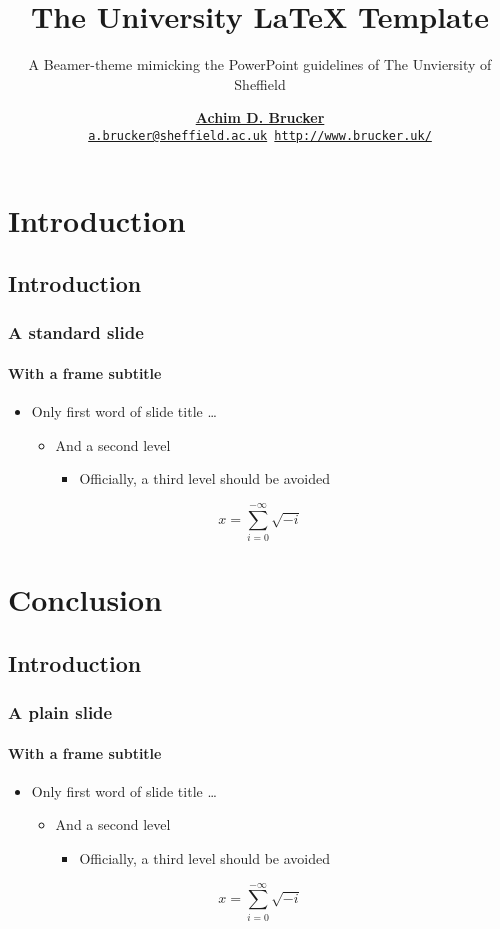 \documentclass[aspectratio=169]{tuos-presentation}
\title{The University \LaTeX{} Template}
\subtitle{A Beamer-theme mimicking the PowerPoint guidelines of The
  Unviersity of Sheffield}
\institute[The University of Sheffield]
{Department of Computer Science, The University of Sheffield, Sheffield, UK}
\author[A.D. Brucker] {%
    \href{http://www.brucker.uk/}{\textbf{Achim D. Brucker}}\\
    \texttt{\footnotesize\href{mailto:"Achim D. Brucker"
        <a.brucker@sheffield.ac.uk>}{a.brucker@sheffield.ac.uk}
      \hspace{.6cm}
      \url{http://www.brucker.uk/}}
    }
\begin{document}
\begin{frame}
  \maketitle
\end{frame}

\AgendaFrame

\section{Introduction}
\subsection{Introduction}
\begin{frame}
  \frametitle{A standard slide}
  \framesubtitle{With a frame subtitle}
  \begin{itemize}
  \item Only first word of slide title \ldots
    \begin{itemize}
    \item  And a second level 
      \begin{itemize}
      \item  Officially, a third level should be avoided
      \end{itemize}
    \end{itemize}
  \end{itemize}
  \[ x = \sum_{i=0}^{-\infty}\sqrt{-i}\]
\end{frame}

\section{Conclusion}
\subsection{Introduction}

\begin{frame}[plain]
  \frametitle{A plain slide}
  \framesubtitle{With a frame subtitle}
  \begin{itemize}
  \item Only first word of slide title \ldots
    \begin{itemize}
    \item  And a second level 
      \begin{itemize}
      \item  Officially, a third level should be avoided
      \end{itemize}
    \end{itemize}
  \end{itemize}
  \[ x = \sum_{i=0}^{-\infty}\sqrt{-i}\]
\end{frame}




\ThanksFrame

\CopyrightFrame
\end{document}
